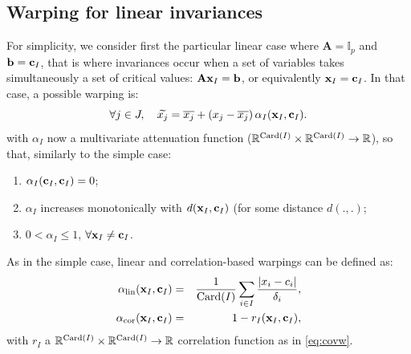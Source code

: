 \subsection{Warping for linear invariances}
For simplicity, we consider first the particular linear case where $\mathbf{A} = \mathbb{I}_p$ and $\mathbf{b}=\mathbf{c}_I$, 
that is where invariances occur when a set of variables takes simultaneously a set of critical values: $\mathbf{A} \mathbf{x}_I = \mathbf{b}$, or equivalently $\mathbf{x}_I = \mathbf{c}_I$.
In that case, a possible warping is:
\begin{equation}
 \forall j \in J, \quad \widetilde{x_j} = \overline{x_j} + \left( x_j - \overline{x_j}\right) {\alpha_I}(\mathbf{x}_I, \mathbf{c}_I)\label{eq:and}.
\end{equation}
with ${\alpha_I}$ now a multivariate attenuation function ($\mathbb{R}^{\operatorname{Card}(I)} \times \mathbb{R}^{\operatorname{Card}(I)} \rightarrow \mathbb{R}$), so that, similarly to the simple case: 
\begin{enumerate}
 \item $\alpha_I(\mathbf{c}_I, \mathbf{c}_I) = 0$;
 \item $\alpha_I$ increases monotonically with $d(\mathbf{x}_I, \mathbf{c}_I)$ (for some distance $d(.,.)$;
 \item $0 < \alpha_I \leq 1$, $\forall \mathbf{x}_I \neq \mathbf{c}_I$.
\end{enumerate}

As in the simple case, linear and correlation-based warpings can be defined as:
\begin{eqnarray}
 \alpha_\text{lin}(\mathbf{x}_I,  \mathbf{c}_I) &=& \frac{1}{\operatorname{Card}(I)} \sum_{i \in I}\frac{\lvert x_i - c_i \rvert}{\delta_i}, \\
  \alpha_\text{cor}(\mathbf{x}_I,  \mathbf{c}_I) &=& 1 - r_I(\mathbf{x}_I, \mathbf{c}_I),
\end{eqnarray}
with $r_I$ a $\mathbb{R}^{\operatorname{Card}(I)} \times \mathbb{R}^{\operatorname{Card}(I)} \rightarrow \mathbb{R}$ correlation function as in \ref{eq:covw}.


